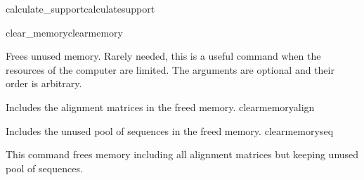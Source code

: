 \begin{command}{calculate\_support}{calculatesupport}
\begin{poyexamples}
\end{poyexamples}

\begin{poyalso}
\end{poyalso}

\end{command}


\begin{command}{clear\_memory}{clearmemory}


\begin{poydescription}
Frees unused memory. Rarely needed, this is a useful command when the
resources of the computer are limited. The arguments are optional and
their order is arbitrary.
\end{poydescription}

\begin{arguments}
{Includes the alignment matrices in the freed memory.} 
{clearmemoryalign}

{Includes the unused pool of sequences in the freed memory.}
{clearmemoryseq}
\end{arguments}


\begin{poyexamples}
{This command frees memory including all alignment matrices but keeping
unused pool of sequences.}
\end{poyexamples}

\begin{poyalso}
\end{poyalso}

\end{command}


